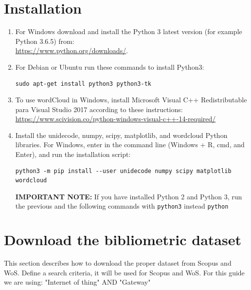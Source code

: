 \documentclass[10pt,letterpaper]{article}
\begin{document}
\section{Installation}

\begin{enumerate}
\item For Windows download and install the Python 3 latest version (for example Python 3.6.5) from: \\ \url{https://www.python.org/downloads/}.
\item For Debian or Ubuntu run these commands to install Python3: 
\begin{verbatim}
sudo apt-get install python3 python3-tk
\end{verbatim}

\item To use wordCloud in Windows, install Microsoft Visual C++ Redistributable para Visual Studio 2017 according to these instructions: \url{https://www.scivision.co/python-windows-visual-c++-14-required/}

\item Install the unidecode, numpy, scipy, matplotlib, and wordcloud Python libraries. For Windows, enter in the command line (Windows + R, cmd, and Enter), and run the installation script:
\begin{verbatim}
python3 -m pip install --user unidecode numpy scipy matplotlib wordcloud
\end{verbatim}

\textbf{IMPORTANT NOTE:} If you have installed Python 2 and Python 3, run the previous and the following commands with \verb|python3| instead \verb|python|
\end{enumerate}

\section{Download the bibliometric dataset}
This section describes how to download the proper dataset from Scopus and WoS. Define a search criteria, it will be used for Scopus and WoS. For this guide we are using: "Internet of thing"  AND  "Gateway" 
\end{document}
